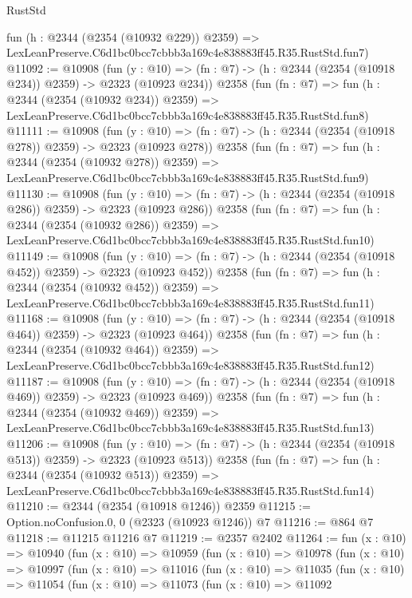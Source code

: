 \begin{lexlean}{RustStd}
\begin{coremodule}
    fun (h : @2344 (@2354 (@10932 @229)) @2359) =>
    LexLeanPreserve.C6d1bc0bcc7cbbb3a169c4e838883ff45.R35.RustStd.fun7)
@11092 := @10908
    (fun (y : @10) => (fn : @7) -> (h : @2344 (@2354 (@10918 @234)) @2359) -> @2323 (@10923 @234))
    @2358
    (fun (fn : @7) =>
    fun (h : @2344 (@2354 (@10932 @234)) @2359) =>
    LexLeanPreserve.C6d1bc0bcc7cbbb3a169c4e838883ff45.R35.RustStd.fun8)
@11111 := @10908
    (fun (y : @10) => (fn : @7) -> (h : @2344 (@2354 (@10918 @278)) @2359) -> @2323 (@10923 @278))
    @2358
    (fun (fn : @7) =>
    fun (h : @2344 (@2354 (@10932 @278)) @2359) =>
    LexLeanPreserve.C6d1bc0bcc7cbbb3a169c4e838883ff45.R35.RustStd.fun9)
@11130 := @10908
    (fun (y : @10) => (fn : @7) -> (h : @2344 (@2354 (@10918 @286)) @2359) -> @2323 (@10923 @286))
    @2358
    (fun (fn : @7) =>
    fun (h : @2344 (@2354 (@10932 @286)) @2359) =>
    LexLeanPreserve.C6d1bc0bcc7cbbb3a169c4e838883ff45.R35.RustStd.fun10)
@11149 := @10908
    (fun (y : @10) => (fn : @7) -> (h : @2344 (@2354 (@10918 @452)) @2359) -> @2323 (@10923 @452))
    @2358
    (fun (fn : @7) =>
    fun (h : @2344 (@2354 (@10932 @452)) @2359) =>
    LexLeanPreserve.C6d1bc0bcc7cbbb3a169c4e838883ff45.R35.RustStd.fun11)
@11168 := @10908
    (fun (y : @10) => (fn : @7) -> (h : @2344 (@2354 (@10918 @464)) @2359) -> @2323 (@10923 @464))
    @2358
    (fun (fn : @7) =>
    fun (h : @2344 (@2354 (@10932 @464)) @2359) =>
    LexLeanPreserve.C6d1bc0bcc7cbbb3a169c4e838883ff45.R35.RustStd.fun12)
@11187 := @10908
    (fun (y : @10) => (fn : @7) -> (h : @2344 (@2354 (@10918 @469)) @2359) -> @2323 (@10923 @469))
    @2358
    (fun (fn : @7) =>
    fun (h : @2344 (@2354 (@10932 @469)) @2359) =>
    LexLeanPreserve.C6d1bc0bcc7cbbb3a169c4e838883ff45.R35.RustStd.fun13)
@11206 := @10908
    (fun (y : @10) => (fn : @7) -> (h : @2344 (@2354 (@10918 @513)) @2359) -> @2323 (@10923 @513))
    @2358
    (fun (fn : @7) =>
    fun (h : @2344 (@2354 (@10932 @513)) @2359) =>
    LexLeanPreserve.C6d1bc0bcc7cbbb3a169c4e838883ff45.R35.RustStd.fun14)
@11210 := @2344 (@2354 (@10918 @1246)) @2359
@11215 := Option.noConfusion.{0, 0} (@2323 (@10923 @1246)) @7
@11216 := @864 @7
@11218 := @11215 @11216 @7
@11219 := @2357 @2402
@11264 := fun (x : @10) =>
  @10940
    (fun (x : @10) =>
    @10959
      (fun (x : @10) =>
      @10978
        (fun (x : @10) =>
        @10997
          (fun (x : @10) =>
          @11016
            (fun (x : @10) =>
            @11035
              (fun (x : @10) =>
              @11054
                (fun (x : @10) =>
                @11073
                  (fun (x : @10) =>
                  @11092

\end{coremodule}
\end{lexlean}
